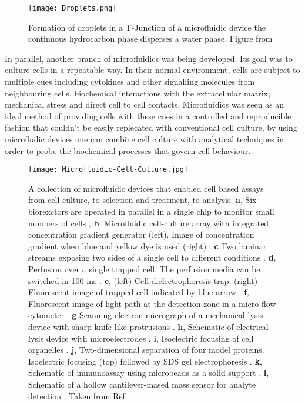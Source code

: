 \begin{figure}
  \texttt{[image: Droplets.png]}
  \caption{Formation of droplets in a T-Junction of a microfluidic device the continuous hydrocarbon
  phase disperses a water phase. Figure from \citep{RN104}}
  \label{fig:IntroDrops}
\end{figure}



In parallel, another branch of microfluidics was being developed. Its goal was to
culture cells in a repeatable way. In their normal environment, cells are subject to multiple
cues including cytokines and other signalling molecules from neighbouring cells, biochemical
interactions with the extracellular matrix, mechanical stress and direct cell to cell contacts.
Microfluidics was seen as an ideal method of providing cells with these cues in a controlled and reproducible fashion that couldn't be easily
replecated with conventional cell culture, by using microfludic devices one can combine
cell culture with analytical techniques in order to probe the biochemical processes that
govern cell behaviour.

\begin{figure}
  \begin{center}
  \texttt{[image: Microfluidic-Cell-Culture.jpg]}
  \end{center}
  \caption{A collection of microfluidic devices that enabled cell based assays from cell culture, to selection and treatment,
  to analysis. \textbf{a}, Six biorexctors are operated in parallel in a single chip to monitor small numbers of cells \citep{balagadde2005long},
  \textbf{b}, Microfluidic cell-culture array with integrated concentration gradient generator (left). Image of concentration
  gradient when blue and yellow dye is used (right) \citep{RN41}. \textbf{c} Two laminar streams exposing two sides of a single cell to different
  conditions \citep{takayama2001laminar}.
  \textbf{d}, Perfusion over a single trapped cell. The perfusion media can be switched in 100 ms \citep{wheeler2003microfluidic}. \textbf{e}, (left) Cell dielectrophoresis
  trap. (right) Fluorescent image of trapped cell indicated by blue arrow \citep{Voldman:2002gf}. \textbf{f}, Fluorescent image of light path at the detection
  zone in a micro flow cytometer \citep{wang2004measurements}. \textbf{g} Scanning electron micrograph of a mechanical lysis device with sharp knife-like protrusions \citep{di2003reagentless}.
  \textbf{h}, Schematic of electrical lysis device with microelectrodes \citep{lee1999micro}. \textbf{i}, Isoelectric focusing of cell organelles \citep{lu2004microfabricated}.
  \textbf{j}, Two-dimensional separation of four model proteins. Isoelectric focusing (top) followed by SDS gel electrophoresis \citep{li2004integration}.
  \textbf{k}, Schematic of immunoassay using microbeads as a solid support \citep{sato2002microchip}. \textbf{l}, Schematic of a hollow cantilever-mased mass sensor
  for analyte detection \citep{burg2003suspended}. Taken from Ref.\citep{el2006cells}}
  \label{fig:CellCulture}
\end{figure}


